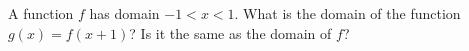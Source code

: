A function $f$ has domain $-1<x<1$. What is the domain of the function $g(x)=f(x+1)$? Is it the same as the domain of $f$?
